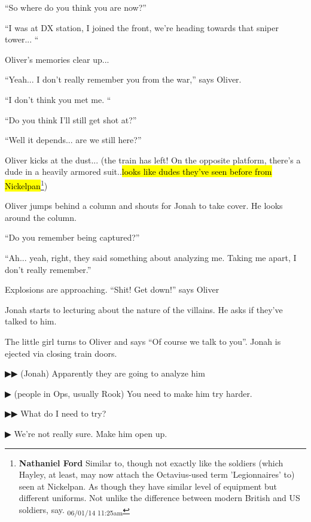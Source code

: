 ``So where do you think you are now?''

``I was at DX station, I joined the front, we're heading towards that sniper tower... ``

Oliver's memories clear up...

``Yeah... I don't really remember you from the war,'' says Oliver.

``I don't think you met me. ``

``Do you think I'll still get shot at?''

``Well it depends... are we still here?''

Oliver kicks at the dust...  (the train has left!  On the opposite platform, there's a dude in a heavily armored suit..\hl{looks like dudes they've seen before from Nickelpan}\footnote{\textbf{Nathaniel Ford }Similar to, though not exactly like the soldiers (which Hayley, at least, may now attach the Octavius-used term 'Legionnaires' to) seen at Nickelpan. As though they have similar level of equipment but different uniforms. Not unlike the difference between modern British and US soldiers, say. \textsubscript{06/01/14 11:25am}}) 

Oliver jumps behind a column and shouts for Jonah to take cover.  He looks around the column.

``Do you remember being captured?''

``Ah... yeah, right, they said something about analyzing me.  Taking me apart, I don't really remember.''

Explosions are approaching. ``Shit! Get down!'' says Oliver

Jonah starts to lecturing about the nature of the villains.  He asks if they've talked to him.

The little girl turns to Oliver and says ``Of course we talk to you''.  Jonah is ejected via closing train doors.\\


{\parskip=0pt
 {\color[RGB]{68,68,68}▶▶ }  (Jonah) Apparently they are going to analyze him

 {\color[RGB]{68,68,68}▶ } (people in Ops, usually Rook) You need to make him try harder.  

 {\color[RGB]{68,68,68}▶▶ } What do I need to try?

 {\color[RGB]{68,68,68}▶ } We're not really sure. Make him open up. 
}





